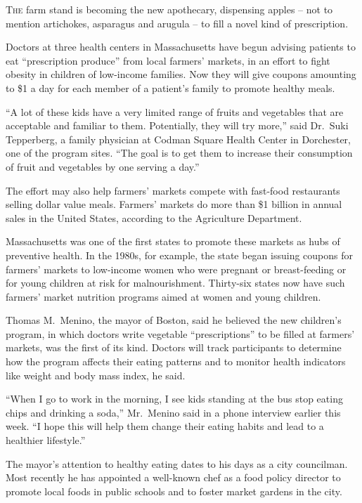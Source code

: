 ﻿\documentclass[12pt]{article}
\begin{document}
\lettrine{T}{he} farm stand is becoming the new apothecary, dispensing
apples -- not to mention artichokes, asparagus and arugula -- to fill a novel kind of prescription.

Doctors at three health centers in Massachusetts have begun advising patients to eat ``prescription
produce'' from local farmers' markets, in an effort to fight obesity in children of low-income
families. Now they will give coupons amounting to \$1 a day for each member of a patient's family to
promote healthy meals.

``A lot of these kids have a very limited range of fruits and vegetables that are acceptable and
familiar to them. Potentially, they will try more,'' said Dr.~Suki Tepperberg, a family physician at
Codman Square Health Center in Dorchester, one of the program sites. ``The goal is to get them to
increase their consumption of fruit and vegetables by one serving a day.''

The effort may also help farmers' markets compete with fast-food restaurants selling dollar value
meals. Farmers' markets do more than \$1 billion in annual sales in the United States, according to
the Agriculture Department.

Massachusetts was one of the first states to promote these markets as hubs of preventive health. In
the 1980s, for example, the state began issuing coupons for farmers' markets to low-income women who
were pregnant or breast-feeding or for young children at risk for malnourishment. Thirty-six states
now have such farmers' market nutrition programs aimed at women and young children.

Thomas M.~Menino, the mayor of Boston, said he believed the new children's program, in which doctors
write vegetable ``prescriptions'' to be filled at farmers' markets, was the first of its kind.
Doctors will track participants to determine how the program affects their eating patterns and to
monitor health indicators like weight and body mass index, he said.

``When I go to work in the morning, I see kids standing at the bus stop eating chips and drinking a
soda,'' Mr.~Menino said in a phone interview earlier this week. ``I hope this will help them change
their eating habits and lead to a healthier lifestyle.''

The mayor's attention to healthy eating dates to his days as a city councilman. Most recently he has
appointed a well-known chef as a food policy director to promote local foods in public schools and
to foster market gardens in the city.
\end{document}
